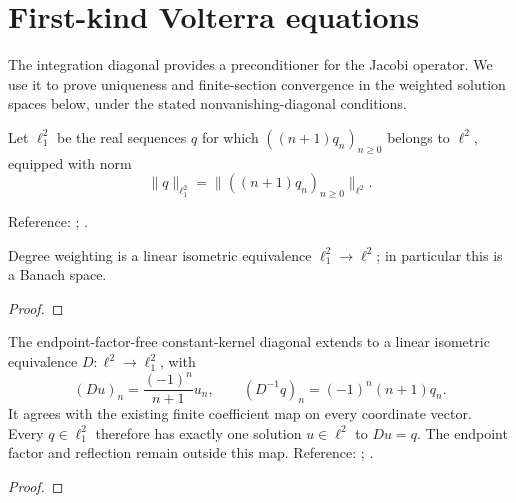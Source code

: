 \chapter{First-kind Volterra equations}\label{chap:volterra-first-kind}
The integration diagonal provides a preconditioner for the Jacobi operator.
We use it to prove uniqueness and finite-section convergence in the weighted
solution spaces below, under the stated nonvanishing-diagonal conditions.

\begin{definition}
\label{def:first-order-l2}
\leanok
Let $\ell^2_1$ be the real sequences $q$ for which $((n+1)q_n)_{n\ge0}$
belongs to $\ell^2$, equipped with norm
\[
 \|q\|_{\ell^2_1}=\|((n+1)q_n)_{n\ge0}\|_{\ell^2}.
\]

Reference: \cite[Definition 5.3]{gutleb-olver}; \cite[Section 2.7]{gutleb-thesis}.
\end{definition}

\begin{theorem}
\label{thm:first-order-l2}
\leanok
Degree weighting is a linear isometric equivalence $\ell^2_1\to\ell^2$; in particular this is a Banach space.
\end{theorem}
\begin{proof}
\leanok
\end{proof}


\begin{theorem}
\label{thm:volterra-first-kind-diagonal}
\leanok
The endpoint-factor-free constant-kernel diagonal extends to a linear
isometric equivalence $D:\ell^2\to\ell^2_1$, with
\[
 (Du)_n=\frac{(-1)^n}{n+1}u_n,\qquad
 (D^{-1}q)_n=(-1)^n(n+1)q_n.
\]
It agrees with the existing finite coefficient map on every coordinate
vector. Every $q\in\ell^2_1$ therefore has exactly one solution $u\in\ell^2$
to $Du=q$. The endpoint factor and reflection remain outside this map.
Reference: \cite[Lemma 5.6]{gutleb-olver}; \cite[Lemma 2.3]{gutleb-thesis}.
\end{theorem}
\begin{proof}
\leanok
\end{proof}

